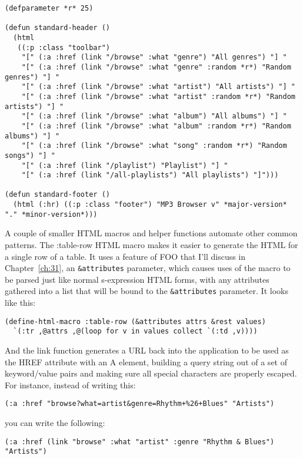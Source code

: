 \begin{lstlisting}
(defparameter *r* 25)

(defun standard-header ()
  (html
   ((:p :class "toolbar")
    "[" (:a :href (link "/browse" :what "genre") "All genres") "] "
    "[" (:a :href (link "/browse" :what "genre" :random *r*) "Random genres") "] "
    "[" (:a :href (link "/browse" :what "artist") "All artists") "] "
    "[" (:a :href (link "/browse" :what "artist" :random *r*) "Random artists") "] "
    "[" (:a :href (link "/browse" :what "album") "All albums") "] "
    "[" (:a :href (link "/browse" :what "album" :random *r*) "Random albums") "] "
    "[" (:a :href (link "/browse" :what "song" :random *r*) "Random songs") "] "
    "[" (:a :href (link "/playlist") "Playlist") "] "
    "[" (:a :href (link "/all-playlists") "All playlists") "]")))

(defun standard-footer ()
  (html (:hr) ((:p :class "footer") "MP3 Browser v" *major-version* "." *minor-version*)))
\end{lstlisting}

A couple of smaller HTML macros and helper functions automate other common patterns. The
:table-row HTML macro makes it easier to generate the HTML for a single row of a table. It
uses a feature of FOO that I'll discuss in Chapter~\ref{ch:31}, an \lstinline!&attributes!
parameter, which causes uses of the macro to be parsed just like normal s-expression HTML
forms, with any attributes gathered into a list that will be bound to the
\lstinline!&attributes!  parameter. It looks like this:

\begin{lstlisting}
(define-html-macro :table-row (&attributes attrs &rest values)
  `(:tr ,@attrs ,@(loop for v in values collect `(:td ,v))))
\end{lstlisting}

And the link function generates a URL back into the application to be used as the HREF
attribute with an A element, building a query string out of a set of keyword/value pairs
and making sure all special characters are properly escaped. For instance, instead of
writing this:

\begin{lstlisting}
(:a :href "browse?what=artist&genre=Rhythm+%26+Blues" "Artists")
\end{lstlisting}

you can write the following:

\begin{lstlisting}
(:a :href (link "browse" :what "artist" :genre "Rhythm & Blues") "Artists")
\end{lstlisting}


